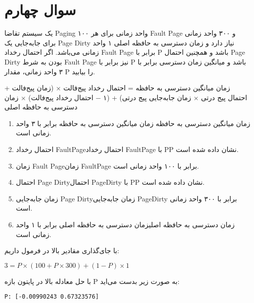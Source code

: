 \section{سوال چهارم}

یک سیستم تقاضا Paging ۱۰۰ واحد زمانی برای هر Fault Page و ۳۰۰ واحد زمانی برای جا‌به‌جایی یک Page Dirty نیاز دارد و زمان دسترسی به حافظه اصلی ۱ واحد زمانی می‌باشد. اگر احتمال رخداد Fault Page برابر با P باشد و همچنین احتمال Page Dirty بودن به شرط Fault Page نیز برابر با P باشد و میانگین زمان دسترسی برابر با ۳ واحد زمانی، مقدار P را بیابید.

\begin{qsolve}
	زمان میانگین دسترسی به حافظه = احتمال رخداد پیج‌فالت × (زمان پیج‌فالت + احتمال پیج درتی × زمان جا‌به‌جایی پیج درتی) + (۱ − احتمال رخداد پیج‌فالت) × زمان دسترسی به حافظه اصلی
	
	\begin{enumerate}
		\item زمان میانگین دسترسی به حافظه زمان میانگین دسترسی به حافظه برابر با ۳ واحد زمانی است.
		\item احتمال رخداد FaultPageاحتمال رخداد FaultPage با PP نشان داده شده است.
		\item زمان Fault Pageزمان FaultPage برابر با ۱۰۰ واحد زمانی است.
		\item احتمال Page Dirtyاحتمال PageDirty با PP نشان داده شده است.
		\item زمان جابه‌جایی Page Dirtyزمان جابه‌جایی PageDirty برابر با ۳۰۰ واحد زمانی است.
		\item زمان دسترسی به حافظه اصلیزمان دسترسی به حافظه اصلی برابر با ۱ واحد زمانی است.
	\end{enumerate}
	
	با جای‌گذاری مقادیر بالا در فرمول داریم: 
	
	\begin{latin}
		$3 = P \times (100 + P \times 300) + (1 - P) \times 1$ 
	\end{latin}
	
	با حل معادله بالا در پایتون بازه P به صورت زیر بدست می‌اید:
	\begin{latin}
		\texttt{P:  [-0.00990243  0.67323576]}
	\end{latin}
	
	
\end{qsolve}

